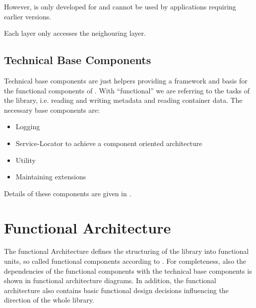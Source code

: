 However, \LibName{} is only developed for \JavaVersion{} and cannot be used by applications requiring earlier versions.

Each layer only accesses the neighouring layer.


\section{Technical Base Components}
\label{sec:TechnicalBasis}

Technical base components are just helpers providing a framework and basis for the functional components of \LibName{}. With ``functional'' we are referring to the tasks of the library, i.e. reading and writing metadata and reading container data. The necessary base components are:
\begin{itemize}
\item Logging
\item Service-Locator to achieve a component oriented architecture
\item Utility
\item Maintaining extensions
\end{itemize}

Details of these components are given in .


\chapter{Functional Architecture}
\label{sec:FunctionalArchitectureChap}

The functional Architecture defines the structuring of the library into functional units, so called functional components according to . For completeness, also the dependencies of the functional components with the technical base components is shown in functional architecture diagrams. In addition, the functional architecture also contains basic functional design decisions influencing the direction of the whole library.

